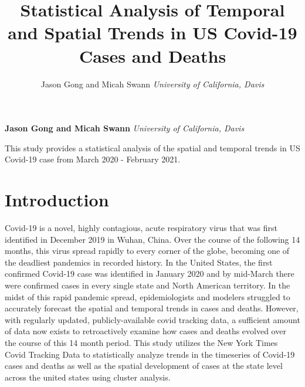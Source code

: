 \documentclass[11pt,]{article}
\title{Statistical Analysis of Temporal and Spatial Trends in US Covid-19 Cases
and Deaths  }
\author{\Large Jason Gong and Micah Swann\vspace{0.05in} \newline\normalsize\emph{University of California, Davis}  }
\date{}
\newcommand*{\authorfont}{\fontfamily{phv}\selectfont}
\renewenvironment{abstract}
 {{%
    \setlength{\leftmargin}{0mm}
    \setlength{\rightmargin}{\leftmargin}%
  }%
  \relax}
 {\endlist}
\begin{document}
	
%

{%
\setlength{\parindent}{0pt}
\thispagestyle{plain}
{\fontsize{18}{20}\selectfont\raggedright 
\maketitle  %

}

{
   \vskip 13.5pt\relax \normalsize\fontsize{11}{12} 
\textbf{\authorfont Jason Gong and Micah Swann} \hskip 15pt \emph{\small University of California, Davis}   

}

}








\begin{abstract}

    \hbox{\vrule height .2pt width 39.14pc}

    \vskip 8.5pt %

\noindent This study provides a statistical analysis of the spatial and temporal
trends in US Covid-19 case from March 2020 - February 2021.


    \hbox{\vrule height .2pt width 39.14pc}


\end{abstract}


\vskip -8.5pt



\noindent  

\hypertarget{introduction}{%
\section{Introduction}\label{introduction}}

Covid-19 is a novel, highly contagious, acute respiratory virus that was
first identified in December 2019 in Wuhan, China. Over the course of
the following 14 months, this virus spread rapidly to every corner of
the globe, becoming one of the deadliest pandemics in recorded history.
In the United States, the first confirmed Covid-19 case was identified
in January 2020 and by mid-March there were confirmed cases in every
single state and North American territory. In the midst of this rapid
pandemic spread, epidemiologists and modelers struggled to accurately
forecast the spatial and temporal trends in cases and deaths. However,
with regularly updated, publicly-available covid tracking data, a
sufficient amount of data now exists to retroactively examine how cases
and deaths evolved over the course of this 14 month period. This study
utilizes the New York Times Covid Tracking Data to statistically analyze
trends in the timeseries of Covid-19 cases and deaths as well as the
spatial development of cases at the state level across the united states
using cluster analysis.
\end{document}
